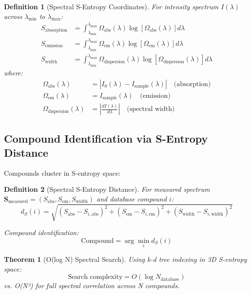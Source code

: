 \documentclass[12pt,a4paper]{article}
\newtheorem{theorem}{Theorem}
\newtheorem{definition}{Definition}
\begin{document}
\begin{definition}[Spectral S-Entropy Coordinates]
For intensity spectrum $I(\lambda)$ across $\lambda_{\min}$ to $\lambda_{\max}$:
\begin{align}
S_{\text{absorption}} &= \int_{\lambda_{\min}}^{\lambda_{\max}} \Omega_{\text{abs}}(\lambda) \log[\Omega_{\text{abs}}(\lambda)] d\lambda \\
S_{\text{emission}} &= \int_{\lambda_{\min}}^{\lambda_{\max}} \Omega_{\text{em}}(\lambda) \log[\Omega_{\text{em}}(\lambda)] d\lambda \\
S_{\text{width}} &= \int_{\lambda_{\min}}^{\lambda_{\max}} \Omega_{\text{dispersion}}(\lambda) \log[\Omega_{\text{dispersion}}(\lambda)] d\lambda
\end{align}
where:
\begin{align}
\Omega_{\text{abs}}(\lambda) &= |I_0(\lambda) - I_{\text{sample}}(\lambda)| \quad \text{(absorption)} \\
\Omega_{\text{em}}(\lambda) &= I_{\text{sample}}(\lambda) \quad \text{(emission)} \\
\Omega_{\text{dispersion}}(\lambda) &= \left|\frac{dI(\lambda)}{d\lambda}\right| \quad \text{(spectral width)}
\end{align}
\end{definition}

\subsection{Compound Identification via S-Entropy Distance}

Compounds cluster in S-entropy space:

\begin{definition}[Spectral S-Entropy Distance]
For measured spectrum $\mathbf{S}_{\text{measured}} = (S_{\text{abs}}, S_{\text{em}}, S_{\text{width}})$ and database compound $i$:
\begin{equation}
d_S(i) = \sqrt{(S_{\text{abs}} - S_{i,\text{abs}})^2 + (S_{\text{em}} - S_{i,\text{em}})^2 + (S_{\text{width}} - S_{i,\text{width}})^2}
\end{equation}

Compound identification:
\begin{equation}
\text{Compound} = \arg\min_i d_S(i)
\end{equation}
\end{definition}

\begin{theorem}[O(log N) Spectral Search]
Using k-d tree indexing in 3D S-entropy space:
\begin{equation}
\text{Search complexity} = O(\log N_{\text{database}})
\end{equation}
vs. O(N²) for full spectral correlation across N compounds.
\end{theorem}
\end{document}
